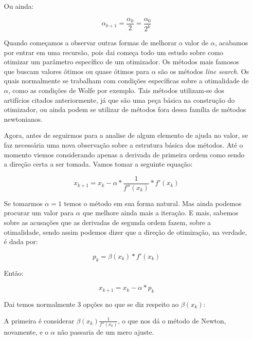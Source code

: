 Ou ainda:

\begin{equation}
    \alpha_{k+1} = \frac{\alpha_{k}}{2} = \frac{\alpha_{0}}{2^k} 
\end{equation}


Quando começamos a observar outras formas de melhorar o valor de \(\alpha\),
acabamos por entrar em uma recursão, pois dai começa todo um estudo sobre como
otimizar um parâmetro específico de um otimizador. Os métodos mais famosos que
buscam valores ótimos ou quase ótimos para \(\alpha\) são os métodos
\textit{line search}. Os quais normalmente se trabalham com condições específicas
sobre a otimalidade de \(\alpha\), como as condições de Wolfe por exemplo. Tais
métodos utilizam-se dos artifícios citados anteriormente, já que são uma peça
básica na construção do otimizador, ou ainda podem se utilizar de métodos fora
dessa família de métodos newtonianos.

Agora, antes de seguirmos para a analise de algum elemento de ajuda no valor, se
faz necessária uma nova observação sobre a estrutura básica dos métodos. Até o
momento viemos considerando apenas a derivada de primeira ordem como sendo a
direção certa a ser tomada. Vamos tomar a seguinte equação:

\begin{equation}
    x_{k+1} = x_{k} - \alpha * \frac{1}{f''(x_k)} * f'(x_k)
\end{equation}

Se tomarmos \(\alpha = 1\) temos o método em sua forma natural. Mas ainda
podemos procurar um valor para \(\alpha\) que melhore ainda mais a iteração.
E mais, sabemos sobre as acusações que as derivadas de segunda ordem fazem,
sobre a otimalidade, sendo assim podemos dizer que a direção de otimização,
na verdade, é dada por:

\begin{equation}
    p_k = \beta(x_k) * f'(x_k)
\end{equation}

Então:

\begin{equation}
    x_{k+1} = x_{k} - \alpha * p_{k}
\end{equation}


Dai temos normalmente 3 opções no que se diz respeito ao \(\beta(x_k)\):

A primeira é considerar \(\beta(x_k) \frac{1}{f''(x_k)}\), o que nos dá
o método de Newton, novamente, e o \(\alpha\) não passaria de um mero ajuste.

